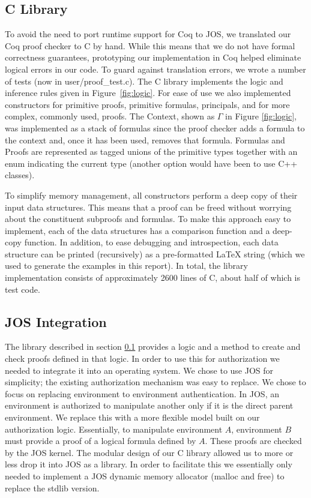 \documentclass[10pt]{article}
\begin{document}
\subsection{C Library} \label{sec:clib}
To avoid the need to port runtime support for Coq to JOS, we translated our Coq proof checker to C by hand.
While this means that we do not have formal correctness guarantees, prototyping our implementation in Coq helped eliminate logical errors in our code. To guard against translation errors, we wrote a number of tests (now in \textsf{user/proof\_test.c}).  The C library implements the logic and inference rules given in Figure~\ref{fig:logic}.  For ease of use we also implemented constructors for primitive proofs, primitive formulas, principals, and for more complex, commonly used, proofs.  The Context, shown as $\Gamma$ in Figure \ref{fig:logic}, was implemented as a stack of formulas since the proof checker adds a formula to the context and, once it has been used, removes that formula.  Formulas and Proofs are represented as tagged \textsf{union}s of the primitive types together with an \textsf{enum} indicating the current type (another option would have been to use C++ classes).  

To simplify memory management, all constructors perform a deep copy of their input data structures. This means that a proof can be freed without worrying about the constituent subproofs and formulas.  To make this approach easy to implement, each of the data structures has a comparison function and a deep-copy function.  In addition, to ease debugging and introspection, each data structure can be printed (recursively) as a pre-formatted \LaTeX{} string (which we used to generate the examples in this report).  In total, the library implementation consists of approximately 2600 lines of C, about half of which is test code.

\subsection{JOS Integration}
The library described in section \ref{sec:clib} provides a logic and a method to create and check proofs defined in that logic.  In order to use this for authorization we needed to integrate it into an operating system.  We chose to use JOS for simplicity; the existing authorization mechanism was easy to replace.  We chose to focus on replacing environment to environment authentication.  In JOS, an environment is authorized to manipulate another only if it is the direct parent environment. We replace this with a more flexible model built on our authorization logic.  Essentially, to manipulate environment $A$, environment $B$ must provide a proof of a logical formula defined by $A$.  These proofs are checked by the JOS kernel. The modular design of our C library allowed us to more or less drop it into JOS as a library.  In order to facilitate this we essentially only needed to implement a JOS dynamic memory allocator (\textsf{malloc} and \textsf{free}) to replace the \textsf{stdlib} version.
\end{document}
